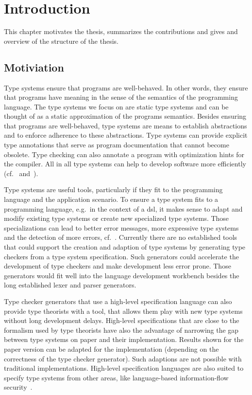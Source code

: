 \chapter{Introduction}
This chapter motivates the thesis, summarizes the contributions and
gives and overview of the structure of the thesis.

\section{Motiviation}
Type systems ensure that programs are well-behaved. In other words,
they ensure that programs have meaning in the sense of the semantics
of the programming language. The type systems we focus on are static
type systems and can be thought of as a static approximation of the
programs semantics. Besides ensuring that programs are well-behaved,
type systems are means to establish abstractions and to enforce
adherence to these abstractions. Type systems can provide explicit
type annotations that serve as program documentation that cannot
become obsolete. Type checking can also annotate a program with
optimization hints for the compiler. All in all type systems can help
to develop software more efficiently
(cf.~\cite{Petersen:2014:ECS:2597008.2597152}
and~\cite{Mayer:2012:ESI:2384616.2384666}).

Type systems are useful tools, particularly if they fit to the
programming language and the application scenario. To ensure a type
system fits to a programming language, e.g.\ in the context of a
\gls{dsl}, it makes sense to adapt and modify existing type systems or
create new specialized type systems. Those specializations can lead to
better error messages, more expressive type systems and the detection
of more errors, cf.~\cite{Thiemann02programmabletype}. Currently there
are no established tools that could support the creation and adaption
of type systems by generating type checkers from a type system
specification. Such generators could accelerate the development of
type checkers and make development less error prone. Those generators
would fit well into the language development workbench besides the
long established lexer and parser generators.

Type checker generators that use a high-level specification language
can also provide type theorists with a tool, that allows them play
with new type systems without long development delays. High-level
specifications that are close to the formalism used by type theorists
have also the advantage of narrowing the gap between type systems on
paper and their implementation. Results shown for the paper version
can be adapted for the implementation (depending on the correctness of
the type checker generator). Such adaptions are not possible with
traditional implementations. High-level specification languages are
also suited to specify type systems from other areas, like
language-based information-flow
security~\cite{Sabelfeld:2006:LIS:2312191.2314769}.

